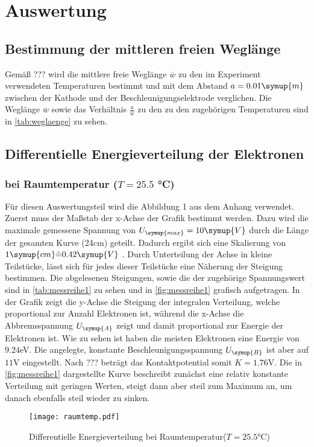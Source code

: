 \section{Auswertung}
\label{sec:Auswertung}
    \subsection{Bestimmung der mittleren freien Weglänge}
    Gemäß ??? wird die mittlere freie Weglänge $\overline{w}$ zu den im Experiment verwendeten Temperaturen bestimmt und mit dem Abstand $a = 0.01 \symup{m}$
    zwischen der Kathode und der Beschleunigungselektrode verglichen. Die Weglänge $\overline{w}$ sowie das Verhältnis $\frac{a}{\overline{w}}$
    zu den zu den zugehörigen Temperaturen sind in \autoref{tab:weglaenge} zu sehen. 
    


    \subsection{Differentielle Energieverteilung der Elektronen}
        \subsubsection{bei Raumtemperatur ($T = 25.5 $ °C)}
        \label{sec:raumtemp}
        Für diesen Auswertungsteil wird die Abbildung 1 aus dem Anhang verwendet. Zuerst muss der Maßstab der x-Achse der Grafik bestimmt werden.
        Dazu wird die maximale gemessene Spannung von $U_{\symup{max}} = 10 \symup{V}$ durch die Länge der gesamten Kurve (24cm) geteilt.
        Dadurch ergibt sich eine Skalierung von $1 \symup{cm} \hat{=} 0.42 \symup{V}$ . Durch Unterteilung der Achse 
        in kleine Teilstücke, lässt sich für jedes dieser Teilstücke eine Näherung der Steigung bestimmen. Die abgelesenen Steigungen, sowie
        die der zugehörige Spannungswert sind in \autoref{tab:messreihe1} zu sehen und in \autoref{fig:messreihe1} grafisch aufgetragen.
        In der Grafik zeigt die y-Achse die Steigung der integralen Verteilung, welche proportional zur Anzahl Elektronen ist, während die x-Achse
        die Abbremsspannung $U_{\symup{A}}$ zeigt und damit proportional zur Energie der Elektronen ist.
        Wie zu sehen ist haben die meisten Elektronen eine Energie von $9.24$eV. Die angelegte, konstante Beschleunigungsspannung $U_{\symup{B}}$
        ist aber auf $11$V eingestellt. Nach ??? beträgt das Kontaktpotential somit $K = 1.76$V. Die in \autoref{fig:messreihe1} dargestellte 
        Kurve beschreibt zunächst eine relativ konstante Verteilung mit geringen Werten, steigt dann aber steil zum Maximum an, um danach ebenfalls steil
        wieder zu sinken.
        
        \begin{figure}
          \centering
          \texttt{[image: raumtemp.pdf]}
          \caption{Differentielle Energieverteilung bei Raumtemperatur($T = 25.5$°C)}
          \label{fig:raumtemp}
        \end{figure}


